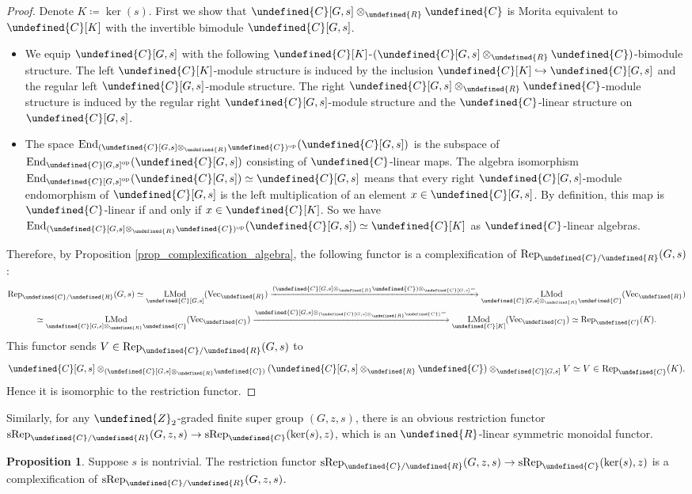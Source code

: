 \documentclass[10pt]{article}
\let\mathbb\undefined
\theoremstyle{definition}
\newtheorem{prop}[thm]{Proposition}
\numberwithin{equation}{section}
\numberwithin{thm}{section}
\newcommand{\bit}{\begin{itemize}}
\newcommand{\eit}{\end{itemize}}
\newcommand{\pf}{\begin{proof}}
\newcommand{\epf}{\end{proof}}
\newcommand{\Cb}{\mathbb{C}}
\newcommand{\Rb}{\mathbb{R}}
\newcommand{\Zb}{\mathbb{Z}}
\DeclareMathOperator{\End}{End}
\DeclareMathOperator{\LMod}{LMod}
\newcommand{\op}{\mathrm{op}}
\newcommand{\vect}{\mathrm{Vec}}
\newcommand{\rep}{\mathrm{Rep}}
\newcommand{\srep}{\mathrm{sRep}}
\begin{document}
\pf
Denote $K \coloneqq \ker(s)$. First we show that $\Cb[G,s] \otimes_\Rb \Cb$ is Morita equivalent to $\Cb[K]$ with the invertible bimodule $\Cb[G,s]$.
\bit
\item We equip $\Cb[G,s]$ with the following $\Cb[K]$-$(\Cb[G,s] \otimes_\Rb \Cb)$-bimodule structure. The left $\Cb[K]$-module structure is induced by the inclusion $\Cb[K] \hookrightarrow \Cb[G,s]$ and the regular left $\Cb[G,s]$-module structure. The right $\Cb[G,s] \otimes_\Rb \Cb$-module structure is induced by the regular right $\Cb[G,s]$-module structure and the $\Cb$-linear structure on $\Cb[G,s]$. 
\item The space $\End_{(\Cb[G,s] \otimes_\Rb \Cb)^\op}(\Cb[G,s])$ is the subspace of $\End_{\Cb[G,s]^\op}(\Cb[G,s])$ consisting of $\Cb$-linear maps. The algebra isomorphism $\End_{\Cb[G,s]^\op}(\Cb[G,s]) \simeq \Cb[G,s]$ means that every right $\Cb[G,s]$-module endomorphism of $\Cb[G,s]$ is the left multiplication of an element $x \in \Cb[G,s]$. By definition, this map is $\Cb$-linear if and only if $x \in \Cb[K]$. So we have $\End_{(\Cb[G,s] \otimes_\Rb \Cb)^\op}(\Cb[G,s]) \simeq \Cb[K]$ as $\Cb$-linear algebras.
\eit
Therefore, by Proposition \ref{prop_complexification_algebra}, the following functor is a complexification of $\rep_{\Cb/\Rb}(G,s)$:
\begin{multline*}
\rep_{\Cb/\Rb}(G,s) \simeq \LMod_{\Cb[G,s]}(\vect_\Rb) \xrightarrow{(\Cb[G,s] \otimes_\Rb \Cb) \otimes_{\Cb[G,s]} -} \LMod_{\Cb[G,s] \otimes_\Rb \Cb}(\vect_\Rb) \\
\simeq \LMod_{\Cb[G,s] \otimes_\Rb \Cb}(\vect_\Cb) \xrightarrow{\Cb[G,s] \otimes_{(\Cb[G,s] \otimes_\Rb \Cb)} -} \LMod_{\Cb[K]}(\vect_\Cb) \simeq \rep_\Cb(K) .
\end{multline*}
This functor sends $V \in \rep_{\Cb/\Rb}(G,s)$ to
\[
\Cb[G,s] \otimes_{(\Cb[G,s] \otimes_\Rb \Cb)} (\Cb[G,s] \otimes_\Rb \Cb) \otimes_{\Cb[G,s]} V \simeq V \in \rep_\Cb(K) .
\]
Hence it is isomorphic to the restriction functor.
\epf

Similarly, for any $\Zb_2$-graded finite super group $(G,z,s)$, there is an obvious restriction functor $\srep_{\Cb/\Rb}(G,z,s) \to \srep_\Cb(\ker(s),z)$, which is an $\Rb$-linear symmetric monoidal functor.

\begin{prop}
Suppose $s$ is nontrivial. The restriction functor $\srep_{\Cb/\Rb}(G,z,s) \to \srep_\Cb(\ker(s),z)$ is a complexification of $\srep_{\Cb/\Rb}(G,z,s)$.
\end{prop}
\end{document}
